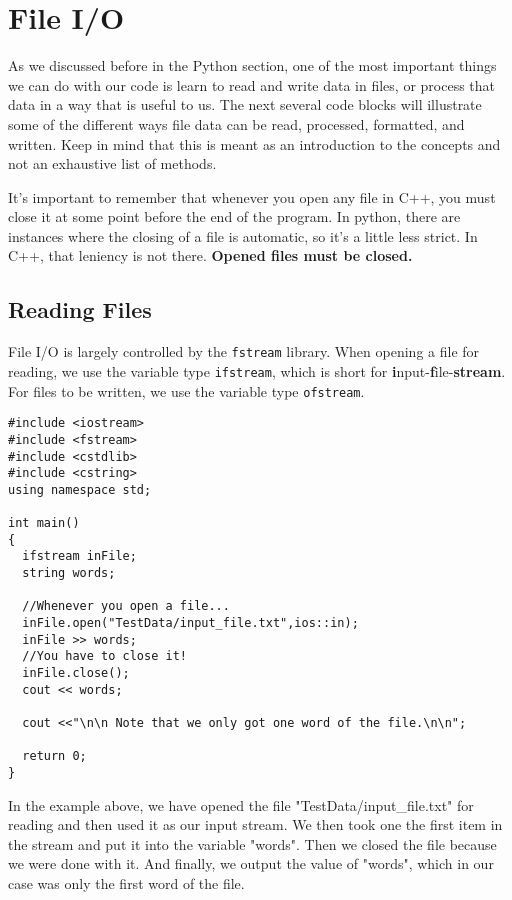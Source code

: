 \section{File I/O}

As we discussed before in the Python section, one of the most important things we can do with our code is learn to read and write data in files, or process that data in a way that is useful to us.  The next several code blocks will illustrate some of the different ways file data can be read, processed, formatted, and written.
Keep in mind that this is meant as an introduction to the concepts and not an exhaustive list of methods.

It's important to remember that whenever you open any file in C++, you must close it at some point before the end of the program.  In python, there are instances where the closing of a file is automatic, so it's a little less strict.  In C++, that leniency is not there.  \textbf{Opened files must be closed.}

\subsection*{Reading Files}
File I/O is largely controlled by the \texttt{fstream} library.  When opening a file for reading, we use the variable type \texttt{ifstream}, which is short for \textbf{i}nput-\textbf{f}ile-\textbf{stream}.  For files to be written, we use the variable type \texttt{ofstream}.

\begin{verbatim}
#include <iostream>
#include <fstream>
#include <cstdlib>
#include <cstring>
using namespace std;

int main()
{
  ifstream inFile;
  string words;
  
  //Whenever you open a file...
  inFile.open("TestData/input_file.txt",ios::in);
  inFile >> words;
  //You have to close it!
  inFile.close();
  cout << words;
  
  cout <<"\n\n Note that we only got one word of the file.\n\n";

  return 0;
}
\end{verbatim}

In the example above, we have opened the file "TestData/input\_file.txt" for reading and then used it as our input stream.  We then took one the first item in the stream and put it into the variable "words".  Then we closed the file because we were done with it.  And finally, we output the value of "words", which in our case was only the first word of the file.

